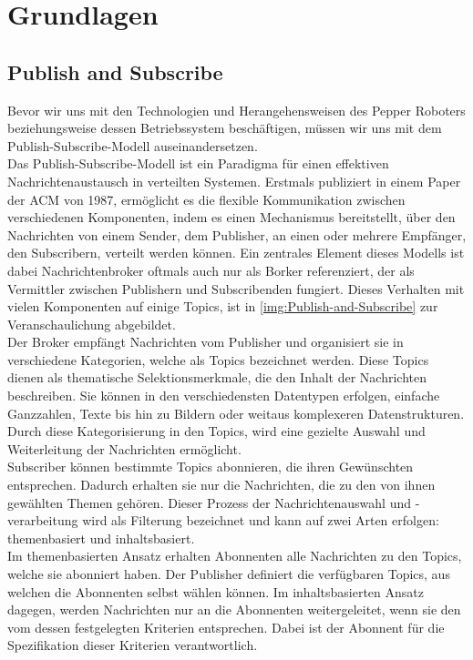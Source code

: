 \chapter{Grundlagen}\label{chap:Grundlagen}


\section{Publish and Subscribe}\label{sec:PublishAndSubscribe}
Bevor wir uns mit den Technologien und Herangehensweisen des Pepper Roboters beziehungsweise dessen Betriebssystem beschäftigen, müssen wir uns mit dem Publish-Subscribe-Modell auseinandersetzen.\\
Das Publish-Subscribe-Modell ist ein Paradigma für einen effektiven Nachrichtenaustausch in verteilten Systemen. Erstmals publiziert in einem Paper der \ac{ACM} von 1987\cite{wiki_publish_subscribe_pattern}, ermöglicht es die flexible Kommunikation zwischen verschiedenen Komponenten, indem es einen Mechanismus bereitstellt, über den Nachrichten von einem Sender, dem Publisher, an einen oder mehrere Empfänger, den Subscribern, verteilt werden können. Ein zentrales Element dieses Modells ist dabei Nachrichtenbroker oftmals auch nur als Borker referenziert, der als Vermittler zwischen Publishern und Subscribenden fungiert. Dieses Verhalten mit vielen Komponenten auf einige Topics, ist in \autoref{img:Publish-and-Subscribe} zur Veranschaulichung abgebildet.\\
Der Broker empfängt Nachrichten vom Publisher und organisiert sie in verschiedene Kategorien, welche als Topics bezeichnet werden. Diese Topics dienen als thematische Selektionsmerkmale, die den Inhalt der Nachrichten beschreiben. Sie können in den verschiedensten Datentypen erfolgen, einfache Ganzzahlen, Texte bis hin zu Bildern oder weitaus komplexeren Datenstrukturen. Durch diese Kategorisierung in den Topics, wird eine gezielte Auswahl und Weiterleitung der Nachrichten ermöglicht.\\
Subscriber können bestimmte Topics abonnieren, die ihren Gewünschten entsprechen. Dadurch erhalten sie nur die Nachrichten, die zu den von ihnen gewählten Themen gehören. Dieser Prozess der Nachrichtenauswahl und -verarbeitung wird als Filterung bezeichnet und kann auf zwei Arten erfolgen: themenbasiert und inhaltsbasiert.\\
Im themenbasierten Ansatz erhalten Abonnenten alle Nachrichten zu den Topics, welche sie abonniert haben. Der Publisher definiert die verfügbaren Topics, aus welchen die Abonnenten selbst wählen können. Im inhaltsbasierten Ansatz dagegen, werden Nachrichten nur an die Abonnenten weitergeleitet, wenn sie den vom dessen festgelegten Kriterien entsprechen. Dabei ist der Abonnent für die Spezifikation dieser Kriterien verantwortlich\cite{itwissen_publish_subscribe_model}.\\
